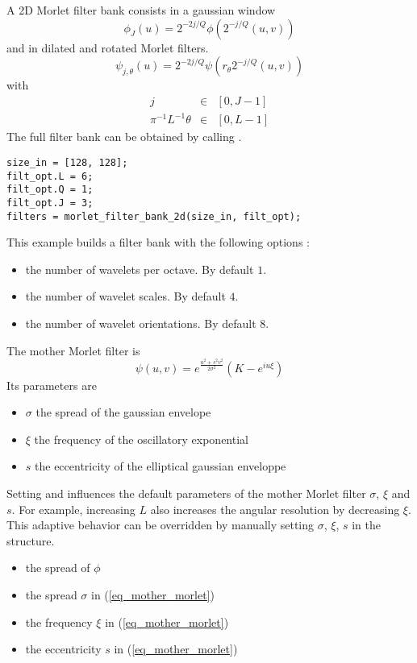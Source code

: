 \documentclass{article}
\begin{document}
A 2D Morlet filter bank consists in a gaussian window 
\begin{equation}
\phi_J (u) =  2^{-2j/Q} \phi(2^{-j/Q} (u,v))
\end{equation}
and in dilated and rotated Morlet filters.
\begin{equation}
\psi_{j, \theta}(u) = 2^{-2j/Q} \psi(r_\theta 2^{-j/Q} (u,v)) 
\end{equation}
with 
\begin{eqnarray}
j & \in & [0,J-1] \\
\pi^{-1} L^{-1} \theta & \in & [0,L-1]
\end{eqnarray}
The full filter bank can be obtained by calling 
. 
\begin{lstlisting}
size_in = [128, 128];
filt_opt.L = 6;
filt_opt.Q = 1;
filt_opt.J = 3;
filters = morlet_filter_bank_2d(size_in, filt_opt);
\end{lstlisting}
This example builds a  filter bank with the following options :
\begin{itemize}
	\item {} the number of wavelets per octave. By default $1$.
	\item {}  the number of wavelet scales. By default $4$.
	\item {}  the number of wavelet orientations. By default $8$.
\end{itemize}	



The mother Morlet filter is
\begin{equation}
\label{eq_mother_morlet}
\psi(u,v) = e^{ \frac{u^2 + s^2 v^2}{2 \sigma^2}}(K - e^{i u \xi})
\end{equation}
Its parameters are
\begin{itemize}
\item $\sigma$ the spread of the gaussian envelope 
\item $\xi$ the frequency of the oscillatory exponential
\item $s$ the eccentricity of the elliptical gaussian enveloppe
\end{itemize}
Setting  and  influences the default parameters of the mother Morlet filter $\sigma$, 
$\xi$ and $s$. For example, increasing $L$ also increases the angular resolution by decreasing $\xi$.
This adaptive behavior can be overridden by manually setting $\sigma$, $\xi$, $s$ in the  structure.
\begin{itemize}
	\item {} the spread of $\phi$
	\item {} the spread $\sigma$ in (\ref{eq_mother_morlet})
	\item {} the frequency $\xi$ in (\ref{eq_mother_morlet})
	\item {} the eccentricity $s$ in (\ref{eq_mother_morlet})
\end{itemize}	
\end{document}

